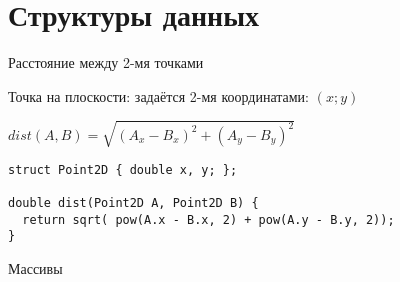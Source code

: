 \section{Структуры данных}

\begin{frame}[t,fragile]{Расстояние между 2-мя точками}

Точка на плоскости: задаётся 2-мя координатами: $(x; y)$

$dist(A, B) = \sqrt{{(A_x - B_x)^2} + {(A_y - B_y)^2}}$

\begin{lstlisting}
struct Point2D { double x, y; };

double dist(Point2D A, Point2D B) {
  return sqrt( pow(A.x - B.x, 2) + pow(A.y - B.y, 2));
}
\end{lstlisting}
\end{frame}

\begin{frame}[t,fragile]{Массивы}


\end{frame}
